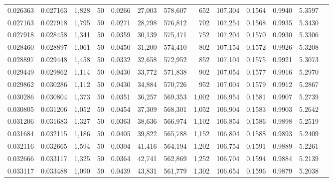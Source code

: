 \begin{tabular}{rrrrrrrrrrrrr}
0.026363 & 0.027163 & 1,828 &  50 &                                     0.0266 &  27,003 & 578,607 &     652 & 107,304 & 0.1564 & 0.9940 & 5.3597 \\
0.027163 & 0.027918 & 1,795 &  50 &                                     0.0271 &  28,798 & 576,812 &     702 & 107,254 & 0.1568 & 0.9935 & 5.3430 \\
0.027918 & 0.028458 & 1,341 &  50 &                                     0.0359 &  30,139 & 575,471 &     752 & 107,204 & 0.1570 & 0.9930 & 5.3306 \\
0.028460 & 0.028897 & 1,061 &  50 &                                     0.0450 &  31,200 & 574,410 &     802 & 107,154 & 0.1572 & 0.9926 & 5.3208 \\
0.028897 & 0.029448 & 1,458 &  50 &                                     0.0332 &  32,658 & 572,952 &     852 & 107,104 & 0.1575 & 0.9921 & 5.3073 \\
0.029449 & 0.029862 & 1,114 &  50 &                                     0.0430 &  33,772 & 571,838 &     902 & 107,054 & 0.1577 & 0.9916 & 5.2970 \\
0.029862 & 0.030286 & 1,112 &  50 &                                     0.0430 &  34,884 & 570,726 &     952 & 107,004 & 0.1579 & 0.9912 & 5.2867 \\
0.030286 & 0.030804 & 1,373 &  50 &                                     0.0351 &  36,257 & 569,353 &   1,002 & 106,954 & 0.1581 & 0.9907 & 5.2739 \\
0.030805 & 0.031206 & 1,052 &  50 &                                     0.0454 &  37,309 & 568,301 &   1,052 & 106,904 & 0.1583 & 0.9903 & 5.2642 \\
0.031206 & 0.031683 & 1,327 &  50 &                                     0.0363 &  38,636 & 566,974 &   1,102 & 106,854 & 0.1586 & 0.9898 & 5.2519 \\
0.031684 & 0.032115 & 1,186 &  50 &                                     0.0405 &  39,822 & 565,788 &   1,152 & 106,804 & 0.1588 & 0.9893 & 5.2409 \\
0.032116 & 0.032665 & 1,594 &  50 &                                     0.0304 &  41,416 & 564,194 &   1,202 & 106,754 & 0.1591 & 0.9889 & 5.2261 \\
0.032666 & 0.033117 & 1,325 &  50 &                                     0.0364 &  42,741 & 562,869 &   1,252 & 106,704 & 0.1594 & 0.9884 & 5.2139 \\
0.033117 & 0.033488 & 1,090 &  50 &                                     0.0439 &  43,831 & 561,779 &   1,302 & 106,654 & 0.1596 & 0.9879 & 5.2038 \\

\end{tabular}

